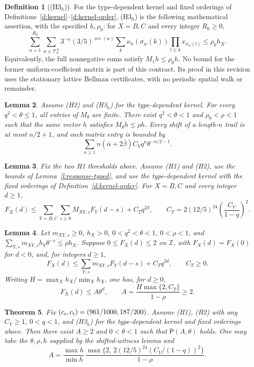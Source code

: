 \documentclass[11pt,reqno]{amsart}
\newtheorem{theorem}{Theorem}[section]
\newtheorem{lemma}[theorem]{Lemma}
\theoremstyle{definition}
\newtheorem{definition}[theorem]{Definition}
\theoremstyle{remark}
\begin{document}
\begin{definition}[(H3\(_h\))]\label{h:H3}
For the type-dependent kernel and fixed orderings of
Definitions~\ref{d:kernel}--\ref{d:kernel-order}, (H3\(_h\)) is the
following mathematical assertion, with the specified \(h,\rho_0\):
for \(X=B,C\) and every integer \(R_0\ge0\),
\[
 \sum_{n=1}^{R_0}\sum_{w\in\mathcal T_n^X}
 3^{-n}(3/5)^{\operatorname{rev}(w)}
 \sum_k\kappa_h(\sigma_w(k))\prod_{l\le k}x_{\sigma_w(l)}
       \le\rho_0h_X .
\]
Equivalently, the full nonnegative sums satisfy \(M_1h\le\rho_0h\).
No bound for the former uniform-coefficient matrix is part of this
contract. Its proof in this revision uses the stationary lattice
Bellman certificates, with no periodic spatial walk or remainder.
\end{definition}

\begin{lemma}\label{l:Mtheta}
Assume (H2) and (H3\(_h\)) for the type-dependent kernel.
For every \(q^2<\theta\le1\), all entries of \(M_\theta\) are
finite. There exist \(q^2<\theta<1\) and \(\rho_0<\rho<1\)
such that the same vector \(h\) satisfies \(M_\theta h\le\rho h\).
Every shift of a length-\(n\) trail is at most \(n/2+1\), and
each matrix entry is bounded by
\[
 \sum_{n\ge1} n(\bar\alpha+2\bar\beta)
                      C_V q^n\theta^{-n/2-1}.
\]
\end{lemma}

\begin{lemma}\label{l:recineq}
Fix the two H1 thresholds above. Assume (H1) and (H2), use
the bounds of Lemma~\ref{l:response-typed}, and use the
type-dependent kernel with the fixed orderings of
Definition~\ref{d:kernel-order}.
For \(X=B,C\) and every integer \(d\ge1\),
\[
 F_X(d)\le\sum_{Y=B,C}\sum_{s\ge0}M_{XY,s}F_Y(d-s)+C_Tq^{2d},
 \qquad
 C_T=2(12/5)^{24}\left(\frac{C_V}{1-q}\right)^2 .
\]
\end{lemma}

\begin{lemma}\label{l:renewal}
Let \(m_{XY,s}\ge0\), \(h_X>0\), \(0<q^2<\theta<1\),
\(0<\rho<1\), and
\(\sum_{Y,s}m_{XY,s}h_Y\theta^{-s}\le\rho h_X\).
Suppose \(0\le F_X(d)\le2\) on \(\mathbb Z\), with
\(F_X(d)=F_X(0)\) for \(d<0\), and, for integers \(d\ge1\),
\[
 F_X(d)\le\sum_{Y,s}m_{XY,s}F_Y(d-s)+C_Tq^{2d},
 \qquad C_T\ge0.
\]
Writing \(H=\max_Xh_X/\min_Xh_X\), one has, for \(d\ge0\),
\[
 F_X(d)\le A\theta^d,\qquad
 A=\frac{H\max\{2,C_T\}}{1-\rho}\ge2 .
\]
\end{lemma}

\begin{theorem}\label{t:rec}
Fix \((c_{\rm s},c_{\rm t})=(961/1000,187/200)\).
Assume (H1), (H2) with any \(C_V\ge1\), \(0<q<1\), and
(H3\(_h\)) for the type-dependent kernel and fixed orderings above.
Then there exist \(A\ge2\) and \(0<\theta<1\) such that
\(\mathsf P(A,\theta)\) holds.
One may take the \(\theta,\rho,h\) supplied by the shifted-witness
lemma and
\[
 A=\frac{\max h}{\min h}\,
       \frac{\max\{2,\,2(12/5)^{24}(C_V/(1-q))^2\}}{1-\rho}.
\]
\end{theorem}
\end{document}
